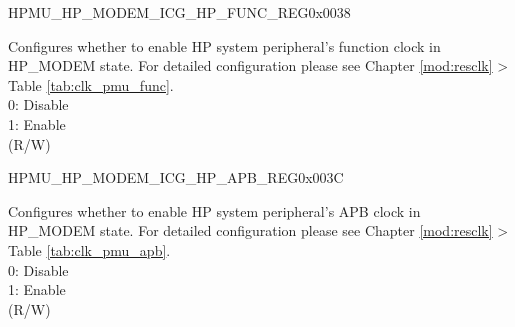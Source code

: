 \begin{register}{H}{PMU\_HP\_MODEM\_ICG\_HP\_FUNC\_REG}{0x0038}\label{regdesc:PMUHPMODEMICGHPFUNCREG}
%
\regnewline%
\begin{regdesc}\begin{reglist}
\label{fielddesc:PMUHPMODEMDIGICGFUNCEN}\item [PMU\_HP\_MODEM\_DIG\_ICG\_FUNC\_EN] Configures whether to enable HP system peripheral's function clock in HP\_MODEM state. For detailed configuration please see Chapter \ref{mod:resclk} \textit{} > Table \ref{tab:clk_pmu_func}.\\
0: Disable\\
1: Enable\\
(R/W)
\end{reglist}\end{regdesc}
\end{register}


\begin{register}{H}{PMU\_HP\_MODEM\_ICG\_HP\_APB\_REG}{0x003C}\label{regdesc:PMUHPMODEMICGHPAPBREG}
%
\regnewline%
\begin{regdesc}\begin{reglist}
\label{fielddesc:PMUHPMODEMDIGICGAPBEN}\item [PMU\_HP\_MODEM\_DIG\_ICG\_APB\_EN] Configures whether to enable HP system peripheral's APB clock in HP\_MODEM state. For detailed configuration please see Chapter \ref{mod:resclk} \textit{} > Table \ref{tab:clk_pmu_apb}.\\
0: Disable\\
1: Enable\\
(R/W)
\end{reglist}\end{regdesc}
\end{register}


